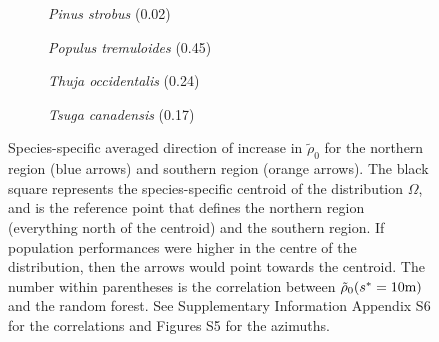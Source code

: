 \begin{figure}[htb]
\begin{subfigure}{0.3\textwidth}
		\label{fig::pinban_az}
	\end{subfigure}
	\hfil
	\begin{subfigure}{0.3\textwidth}
		\centering
		
		\caption{\textit{Pinus strobus} (0.02)}
		\label{fig::pinstr_az}
	\end{subfigure}
	\hfil
	\begin{subfigure}{0.3\textwidth}
		\centering
		
		\caption{\textit{Populus tremuloides} (0.45)}
		\label{fig::poptre_az}
	\end{subfigure}
	\medskip
	\begin{subfigure}{0.3\textwidth}
		\centering
		
		\caption{\textit{Thuja occidentalis} (0.24)}
		\label{fig::thuocc_az}
	\end{subfigure}
	\hfil
	\begin{subfigure}{0.3\textwidth}
		\centering
		
		\caption{\textit{Tsuga canadensis} (0.17)}
		\label{fig::tsucan_az}
	\end{subfigure}
	\hfil
	\begin{subfigure}{0.3\textwidth}
		\centering
		
	\end{subfigure}
	\caption{Species-specific averaged direction of increase in $ \tilde \rho_0 $ for the northern region (blue arrows) and southern region (orange arrows). The black square represents the species-specific centroid of the distribution $ \Omega $, and is the reference point that defines the northern region (everything north of the centroid) and the southern region. If population performances were higher in the centre of the distribution, then the arrows would point towards the centroid. The number within parentheses is the correlation between $ \tilde \rho_0({s}^{*} = 10 \text{m}) $ and the random forest. See Supplementary Information Appendix S6 for the correlations and Figures S5 for the azimuths. \label{fig::grad_cols}}
\end{figure}

